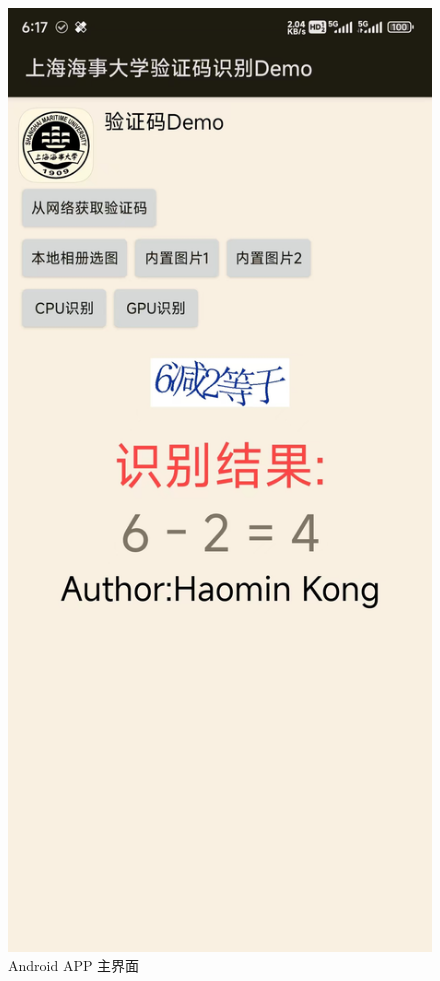 \begin{figure}
	\centering
	\includegraphics[width=0.6\linewidth]{Resources/Picture/activity_main}
	\caption{Android APP 主界面}
	\label{fig:activitymain}
\end{figure}


